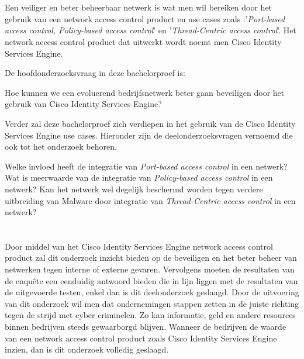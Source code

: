 \section{}
\label{sec:onderzoeksvraag}
Een veiliger en beter beheerbaar netwerk is wat men wil bereiken door het gebruik van een network access control product en use cases zoals :'\textit{Port-based access control, Policy-based access control}' en '\textit{Thread-Centric access control}'. Het network access control product dat uitwerkt wordt noemt men Cisco Identity Services Engine.

De hoofdonderzoeksvraag in deze bachelorproef is: 
\begin{displayquote}
	Hoe kunnen we een evoluerend bedrijfsnetwerk beter gaan beveiligen door het gebruik van Cisco Identity Services Engine?
\newline
\newline
\end{displayquote}
Verder zal deze bachelorproef zich verdiepen in het gebruik van de Cisco Identity Services Engine use cases. Hieronder zijn de deelonderzoeksvragen vernoemd die ook tot het onderzoek behoren.
\begin{displayquote}
	Welke invloed heeft de integratie van \textit{Port-based access control} in een netwerk?  
\newline
\newline
	Wat is meerwaarde van de integratie van \textit{Policy-based access control} in een netwerk?  
\newline
\newline
	Kan het netwerk wel degelijk beschermd worden tegen verdere uitbreiding van Malware door integratie van \textit{Thread-Centric access control} in een netwerk?  
\end{displayquote}

\section{}
\label{sec:onderzoeksdoelstelling}

Door middel van het Cisco Identity Services Engine network access control product zal dit onderzoek inzicht bieden op de beveiligen en het beter beheer van netwerken tegen interne of externe gevaren. Vervolgens moeten de resultaten van de enquête een eenduidig antwoord bieden die in lijn liggen met de resultaten van de uitgevoerde testen, enkel dan is dit deelonderzoek geslaagd. Door de uitvoering van dit onderzoek wil men dat ondernemingen stappen zetten in de juiste richting tegen de strijd met cyber criminelen. Zo kan informatie, geld en andere resources binnen bedrijven steeds gewaarborgd blijven. Wanneer de bedrijven de waarde van een network access control product zoals Cisco Identity Services Engine inzien, dan is dit onderzoek volledig geslaagd.

